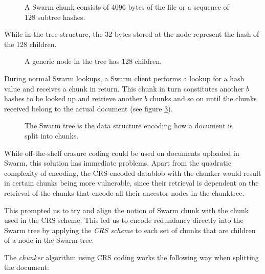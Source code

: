 \begin{figure}[htbp]
   \centering
   
   \caption[Swarm chunk]{A Swarm chunk consists of 4096 bytes of the file or a sequence of 128 subtree hashes.}
   \label{fig:chunk}
\end{figure}

While in the tree structure, the 32 bytes stored at the node represent the hash of the 128 children.

\begin{figure}[htbp]
   \centering
   
   \caption[A generic node in the tree has 128 children]{A generic node in the tree has 128 children.}
   \label{fig:Swarm-hash-basic}
\end{figure}

During normal Swarm lookups, a Swarm client performs a lookup for a hash value and receives a chunk in return. This chunk in turn constitutes another $b$ hashes to be looked up and retrieve another $b$ chunks and so on until the chunks received belong to the actual document (see figure \ref{fig:Swarm-hash-split}).


\begin{figure}[htbp]
   \centering
   
   \caption[Swarm hash split]{The Swarm tree is the data structure encoding how a document is split into chunks.}
   \label{fig:Swarm-hash-split}
\end{figure}

While off-the-shelf erasure coding could be used on documents uploaded in Swarm, this solution has immediate problems. Apart from the quadratic complexity of encoding,  the CRS-encoded datablob with the chunker would result in certain chunks being more vulnerable, since their retrieval is dependent on the retrieval of the chunks that encode all their ancestor nodes in the chunktree.

This prompted us to try and align the notion of Swarm chunk with the chunk used in the CRS scheme. This led us to encode redundancy directly into the Swarm tree by applying the \emph{CRS scheme}  to each set of chunks that are children of a node in the Swarm tree.

The \emph{chunker} algorithm using CRS coding works the following way when splitting the document:

